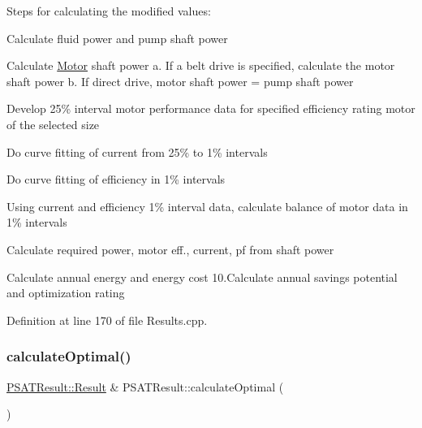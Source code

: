 Steps for calculating the modified values\+:
\begin{DoxyEnumerate}
\item Calculate fluid power and pump shaft power
\item Calculate \hyperlink{struct_motor}{Motor} shaft power a. If a belt drive is specified, calculate the motor shaft power b. If direct drive, motor shaft power = pump shaft power
\item Develop 25\% interval motor performance data for specified efficiency rating motor of the selected size
\item Do curve fitting of current from 25\% to 1\% intervals
\item Do curve fitting of efficiency in 1\% intervals
\item Using current and efficiency 1\% interval data, calculate balance of motor data in 1\% intervals
\item Calculate required power, motor eff., current, pf from shaft power
\item Calculate annual energy and energy cost 10.\+Calculate annual savings potential and optimization rating
\end{DoxyEnumerate}

Definition at line 170 of file Results.\+cpp.

\mbox{\label{class_p_s_a_t_result_af8ddf3ade8aaca5724201ee177894d1a}} 
\subsubsection{\texorpdfstring{calculate\+Optimal()}{calculateOptimal()}}
{\footnotesize\ttfamily \hyperlink{struct_p_s_a_t_result_1_1_result}{P\+S\+A\+T\+Result\+::\+Result} \& P\+S\+A\+T\+Result\+::calculate\+Optimal (\begin{DoxyParamCaption}{ }\end{DoxyParamCaption})}

